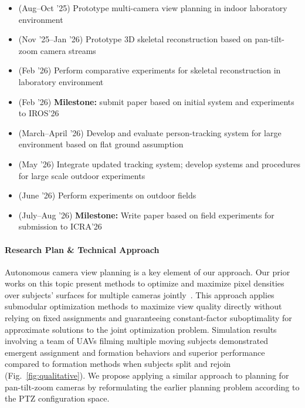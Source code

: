 \documentclass[12pt]{article}
\begin{document}
\begin{itemize}
  \item (Aug--Oct '25) Prototype multi-camera view planning in indoor
    laboratory environment
  \item (Nov '25--Jan '26) Prototype 3D skeletal reconstruction based on
    pan-tilt-zoom camera streams
  \item (Feb '26) Perform comparative experiments for skeletal reconstruction in
    laboratory environment
  \item (Feb '26) \textbf{Milestone:} submit paper based on initial system and
    experiments to IROS'26
  \item (March--April '26) Develop and evaluate person-tracking system for large
    environment based on flat ground assumption
  \item (May '26) Integrate updated tracking system; develop systems and
    procedures for large scale outdoor experiments
  \item (June '26) Perform experiments on outdoor fields
  \item (July--Aug '26) \textbf{Milestone:}
    Write paper based on field experiments for submission to ICRA'26
\end{itemize}


\paragraph{Research Plan \& Technical Approach}

Autonomous camera view planning is a key element of our approach.
Our prior works on this topic present methods to optimize and maximize pixel
densities over subjects' surfaces for multiple cameras
jointly~\citep{suresh2024iros,hughes2024cdc}.
This approach applies submodular optimization methods to maximize view quality
directly without relying on fixed assignments and guaranteeing constant-factor
suboptimality for approximate solutions to the joint optimization problem.
Simulation results involving a team of UAVs filming multiple moving subjects
demonstrated emergent assignment and formation behaviors and superior
performance compared to formation methods when subjects split and rejoin
(Fig.~\ref{fig:qualitative}).
We propose applying a similar approach to planning for pan-tilt-zoom cameras by
reformulating the earlier planning problem according to the PTZ configuration
space.
\end{document}
